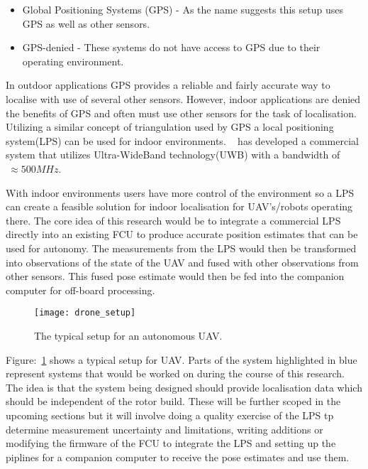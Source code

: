     \begin{itemize}
        \item Global Positioning Systems (GPS) - As the name suggests this setup uses GPS as well as other sensors.
        \item GPS-denied - These systems do not have access to GPS due to their operating environment.
    \end{itemize}
    In outdoor applications GPS provides a reliable and fairly accurate way to localise with use of several other sensors.
    However, indoor applications are denied the benefits of GPS and often must use other sensors for the task of localisation.
    Utilizing a similar concept of triangulation used by GPS a local positioning system(LPS) can be used for indoor environments.
    ~\textcite{pozyx2018pozyx} has developed a commercial system that utilizes Ultra-WideBand technology(UWB) with a bandwidth of $~\approx 500MHz$.

    With indoor environments users have more control of the environment so a LPS can create a feasible solution for indoor localisation for UAV's/robots operating there.
    The core idea of this research would be to integrate a commercial LPS directly into an existing FCU to produce accurate position estimates that can be used for autonomy.
    The measurements from the LPS would then be transformed into observations of the state of the UAV and fused with other observations from other sensors.
    This fused pose estimate would then be fed into the companion computer for off-board processing.
    \begin{figure}[h!]
        \centering
        \texttt{[image: drone\_setup]}
        \caption{The typical setup for an autonomous UAV.}
        \label{fig:ds}
    \end{figure}

    Figure:~\ref{fig:ds} shows a typical setup for UAV.
    Parts of the system highlighted in blue represent systems that would be worked on during the course of this research.
    The idea is that the system being designed should provide localisation data which should be independent of the rotor build.
    These will be further scoped in the upcoming sections but it will involve doing a quality exercise of the LPS tp determine measurement uncertainty and limitations,
    writing additions or modifying the firmware of the FCU to integrate the LPS and setting up the piplines for a companion computer to receive the pose estimates and use them.



